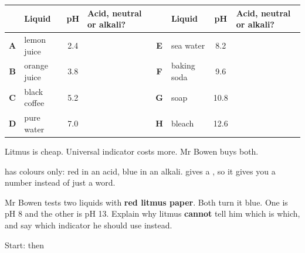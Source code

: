 \documentclass[12pt,a4paper]{article}
\newcommand{\qlines}[1]{\par\needspace{\numexpr#1+1\relax\baselineskip}\wlines{#1}}
\begin{document}
\vspace{4pt}
\noindent
\begin{tabularx}{\textwidth}{|c|p{2.5cm}|c|L|c|p{2.5cm}|c|L|}
  \hline
  & \textbf{Liquid} & \textbf{pH} & \textbf{Acid, neutral} \newline \textbf{or alkali?} &
  & \textbf{Liquid} & \textbf{pH} & \textbf{Acid, neutral} \newline \textbf{or alkali?} \\
  \hline
  \textbf{A} \rule[-0.6em]{0pt}{1.9em} & lemon juice   & 2.4 & &
  \textbf{E} \rule[-0.6em]{0pt}{1.9em} & sea water     & 8.2 & \\ \hline
  \textbf{B} \rule[-0.6em]{0pt}{1.9em} & orange juice  & 3.8 & &
  \textbf{F} \rule[-0.6em]{0pt}{1.9em} & baking soda   & 9.6 & \\ \hline
  \textbf{C} \rule[-0.6em]{0pt}{1.9em} & black coffee  & 5.2 & &
  \textbf{G} \rule[-0.6em]{0pt}{1.9em} & soap          & 10.8 & \\ \hline
  \textbf{D} \rule[-0.6em]{0pt}{1.9em} & pure water    & 7.0 & &
  \textbf{H} \rule[-0.6em]{0pt}{1.9em} & bleach        & 12.6 & \\ \hline
\end{tabularx}


\noindent Litmus is cheap. Universal indicator costs more. Mr Bowen buys both.

\begin{remember}
   has  colours only: red in an acid, blue in an alkali.
   gives a ,
  so it gives you a number instead of just a word.
\end{remember}

\vspace{2pt}
\noindent Mr Bowen tests two liquids with \textbf{red litmus paper}. Both turn it blue.
One is pH 8 and the other is pH 13. Explain why litmus \textbf{cannot} tell him which is
which, and say which indicator he should use instead.

Start:  then

\qlines{3}

\end{document}
